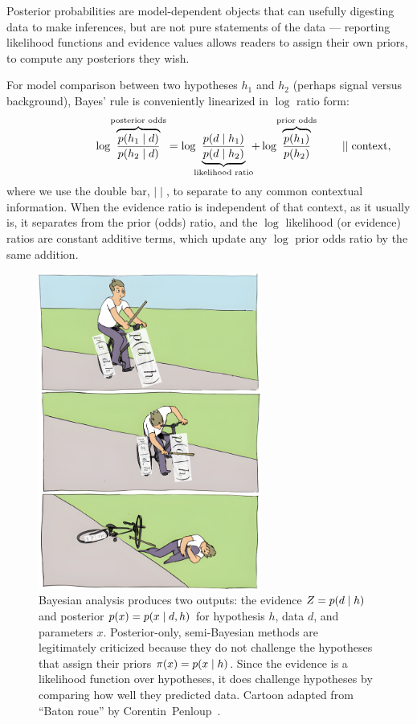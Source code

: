 Posterior probabilities are model-dependent objects that can usefully
digesting data to make inferences, but are not pure statements of the data ---
reporting likelihood functions and evidence values allows readers to assign
their own priors, to compute any posteriors they wish.

For model comparison between two hypotheses $h_1$ and $h_2$
(perhaps signal versus background),
Bayes' rule is conveniently linearized in $\log$ ratio form:
\begin{equation}
\label{eqn:searches_log_odds}
\hphantom{\quad \quad \mid\mid \mathrm{context}}
\log\!
\overbrace{
\frac{\prob{h_1}{d}}{\prob{h_2}{d}}
}^\textrm{posterior odds}
=
\log\!\!
\underbrace{
\frac{\prob{d}{h_1}}{\prob{d}{h_2}}
}_\textrm{likelihood ratio}
\!\!
+
\log\!
\overbrace{
\frac{\probc{h_1}}{\probc{h_2}}
}^\textrm{prior odds}
\quad \quad \mid\mid \mathrm{context}
,
\end{equation}
where we use the double bar, $\mid\mid$, to separate to any common contextual
information.
When the evidence ratio is independent of that context, as it usually is,
it separates from the prior (odds) ratio,
and the $\log$ likelihood (or evidence) ratios are constant additive terms,
which update any $\log$ prior odds ratio by the same addition.

\begin{figure}[tp]
\centering
\includegraphics[width=0.65\textwidth]{figures/searches_baton_roue_bayes.jpg}
\caption[
Bayesian analysis produces two outputs: the evidence and posterior
]{%
Bayesian analysis produces two outputs: the
evidence $Z = p(d \mid h)$ and
posterior $p(x) = p(x \mid d,h)$
for hypothesis $h$, data $d$, and parameters $x$.
Posterior-only, semi-Bayesian methods are legitimately criticized because they
do not challenge the hypotheses that assign their priors
$\pi(x) = p(x \mid h)$.
Since the evidence is a likelihood function over hypotheses, it does challenge
hypotheses by comparing how well they predicted data.
Cartoon adapted from ``Baton roue'' by
Corentin~Penloup~\cite{penloup2011baton}.
}
\label{fig:searches_baton_roue_bayes}
\end{figure}


